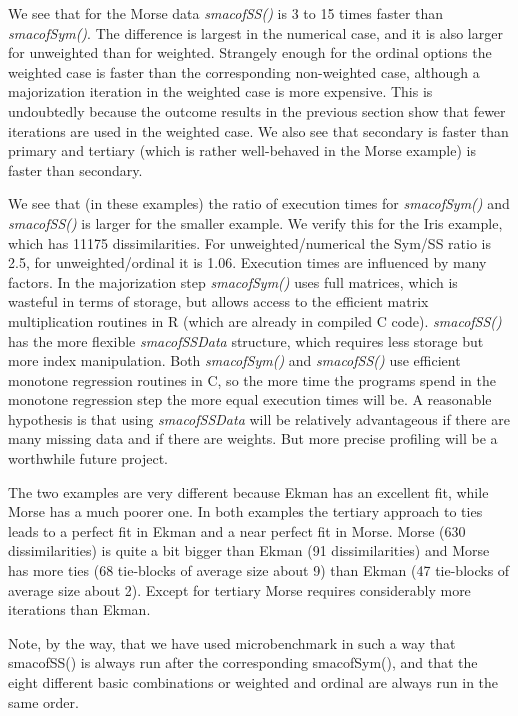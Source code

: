 \documentclass[
  12pt,
  letterpaper,
  DIV=11,
  numbers=noendperiod]{scrartcl}
\begin{document}
We see that for the Morse data \emph{smacofSS()} is 3 to 15 times faster
than \emph{smacofSym()}. The difference is largest in the numerical
case, and it is also larger for unweighted than for weighted. Strangely
enough for the ordinal options the weighted case is faster than the
corresponding non-weighted case, although a majorization iteration in
the weighted case is more expensive. This is undoubtedly because the
outcome results in the previous section show that fewer iterations are
used in the weighted case. We also see that secondary is faster than
primary and tertiary (which is rather well-behaved in the Morse example)
is faster than secondary.

We see that (in these examples) the ratio of execution times for
\emph{smacofSym()} and \emph{smacofSS()} is larger for the smaller
example. We verify this for the Iris example, which has 11175
dissimilarities. For unweighted/numerical the Sym/SS ratio is 2.5, for
unweighted/ordinal it is 1.06. Execution times are influenced by many
factors. In the majorization step \emph{smacofSym()} uses full matrices,
which is wasteful in terms of storage, but allows access to the
efficient matrix multiplication routines in R (which are already in
compiled C code). \emph{smacofSS()} has the more flexible
\emph{smacofSSData} structure, which requires less storage but more
index manipulation. Both \emph{smacofSym()} and \emph{smacofSS()} use
efficient monotone regression routines in C, so the more time the
programs spend in the monotone regression step the more equal execution
times will be. A reasonable hypothesis is that using \emph{smacofSSData}
will be relatively advantageous if there are many missing data and if
there are weights. But more precise profiling will be a worthwhile
future project.

The two examples are very different because Ekman has an excellent fit,
while Morse has a much poorer one. In both examples the tertiary
approach to ties leads to a perfect fit in Ekman and a near perfect fit
in Morse. Morse (630 dissimilarities) is quite a bit bigger than Ekman
(91 dissimilarities) and Morse has more ties (68 tie-blocks of average
size about 9) than Ekman (47 tie-blocks of average size about 2). Except
for tertiary Morse requires considerably more iterations than Ekman.

Note, by the way, that we have used microbenchmark in such a way that
smacofSS() is always run after the corresponding smacofSym(), and that
the eight different basic combinations or weighted and ordinal are
always run in the same order.
\end{document}
